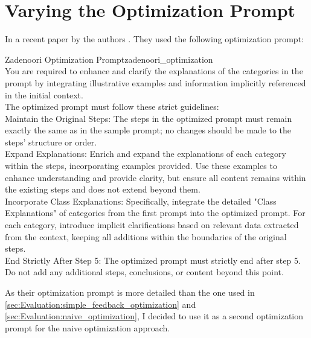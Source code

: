 \section{Varying the Optimization Prompt}
In a recent paper by  the authors .
They used the following optimization prompt:
\begin{prompt}{Zadenoori Optimization Prompt}{zadenoori_optimization}\\
     You are required to enhance and clarify the explanations of the categories in the prompt by integrating illustrative examples and information implicitly referenced in the initial context. \\
     The optimized prompt must follow these strict guidelines: \\
     Maintain the Original Steps: The steps in the optimized prompt must remain exactly the same as in the sample prompt; no changes should be made to the steps’ structure or order. \\
     Expand Explanations: Enrich and expand the explanations of each category within the steps, incorporating examples provided.
     Use these examples to enhance understanding and provide clarity, but ensure all content remains within the existing steps and does not extend beyond them. \\
     Incorporate Class Explanations: Specifically, integrate the detailed "Class Explanations" of categories from the first prompt into the optimized prompt.
     For each category, introduce implicit clarifications based on relevant data extracted from the context, keeping all additions within the boundaries of the original steps. \\
     End Strictly After Step 5: The optimized prompt must strictly end after step 5.
     Do not add any additional steps, conclusions, or content beyond this point. \\
\end{prompt}

As their optimization prompt is more detailed than the one used in \autoref{sec:Evaluation:simple_feedback_optimization} and \autoref{sec:Evaluation:naive_optimization}, I decided to use it as a second optimization prompt for the naive optimization approach.
\begin{table}
    \centering
    \renewcommand{\arraystretch}{1.4}
    
    \renewcommand{\arraystretch}{1}
    \caption{Naive prompt optimization approach using the optimization prompt by \citeauthor{zadenoori2025AutomaticPrompt}}
    \label{tab:zadenoori_optimization}
\end{table}